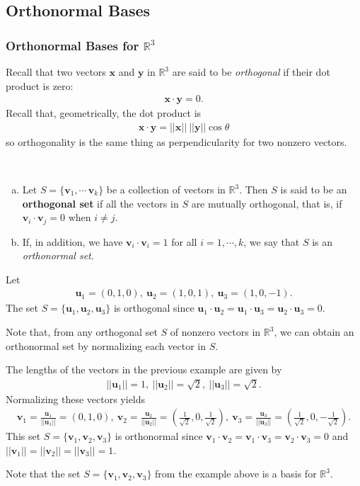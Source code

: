 \documentclass[12pt,letterpaper,reqno]{article}
\numberwithin{equation}{section}
\newcommand{\R}{\ensuremath{\mathbb R}}
\newcommand{\bv}{\mathbf{v}}
\newcommand{\bu}{\mathbf{u}}
\newcommand{\bx}{\mathbf{x}}
\newcommand{\by}{\mathbf{y}}
\begin{document}
 
\subsection{Orthonormal Bases}
\subsubsection{Orthonormal Bases for $\R^3$}
Recall that two vectors $\bx$ and $\by$ in $\mathbb{R}^3$ are said to be \emph{orthogonal} if their dot product is zero:
\begin{align*}
	\bx \cdot \by = 0.
\end{align*}
Recall that, geometrically, the dot product is 
\begin{align*}
	\bx \cdot \by = ||\bx || \ || \by ||\cos \theta
\end{align*}
so orthogonality is the same thing as perpendicularity for two nonzero vectors. 

\begin{defn}
\
\begin{enumerate}[(a)]
	\item Let $S=\{\bv_1,\cdots\,\bv_k\}$ be a collection of vectors in $\mathbb{R}^3$. Then $S$ is said to be an {\bf orthogonal set} if all the vectors in $S$ are mutually orthogonal, that is, if 
		$\bv_i \cdot \bv_j = 0 \text{ when }i \neq j$.
	\item If, in addition, we have $\bv_i \cdot \bv_i=1$ for all $i=1,\cdots,k$, we say that $S$ is an \emph{orthonormal set}.
\end{enumerate}
\end{defn}

\begin{example}
	Let
	\begin{align*}
		\bu_1=(0,1,0), \ \bu_2=(1,0,1), \ \bu_3=(1,0,-1).
	\end{align*}
The set $S=\{\bu_1,\bu_2,\bu_3\}$ is orthogonal since $\bu_1 \cdot \bu_2=\bu_1 \cdot \bu_3=\bu_2\cdot \bu_3=0$.	
\end{example}

Note that, from any orthogonal set $S$ of nonzero vectors in $\mathbb{R}^3$, we can obtain an orthonormal set by normalizing each vector in $S$.	
 
 \begin{example}\label{ex:on_basis_r3}
 	The lengths of the vectors in the previous example are given by
 	\begin{align*}
 		||\bu_1||=1, \ ||\bu_2||=\sqrt{2}, \ ||\bu_3||=\sqrt{2}.
 	\end{align*}
 Normalizing these vectors yields
 \begin{align*}
 	\bv_1=\frac{\bu_1}{||\bu_1||}=(0,1,0), \ \bv_2=\frac{\bu_2}{||\bu_2||}=(\frac{1}{\sqrt{2}},0,\frac{1}{\sqrt{2}}), \ \bv_3=\frac{\bu_3}{||\bu_3||}=(\frac{1}{\sqrt{2}},0,-\frac{1}{\sqrt{2}}).
 \end{align*}
 This set $S=\{\bv_1,\bv_2,\bv_3\}$ is orthonormal since
 	$\bv_1 \cdot \bv_2 = \bv_1 \cdot \bv_3 = \bv_2 \cdot \bv_3 = 0$ and $||\bv_1||=||\bv_2||=||\bv_3||=1$.  
 \end{example}
Note that the set $S=\{\bv_1,\bv_2,\bv_3\}$ from the example above is a basis for $\mathbb{R}^3$.
\end{document}
